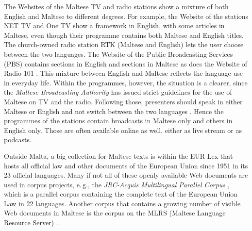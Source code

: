 \begin{multicols}{2}
The Websites of the Maltese TV and radio stations show a mixture of both English and Maltese to different degrees. For example, the Website of the stations NET TV \cite{NetTV1} and One TV \cite{OneTV1} show a framework in English, with some articles in Maltese, even though their programme contains both Maltese and English titles. The church-owned radio station RTK \cite{RTK1} (Maltese and English) lets the user choose between the two languages. The Website of the Public Broadcasting Services (PBS) \cite{PBS1} contains sections in English and sections in Maltese as does the Website of Radio 101 \cite{radio101}. This mixture between English and Maltese reflects the language use in everyday life. Within the programmes, however, the situation is a clearer, since the \emph{Maltese Broadcasting Authority} has issued strict guidelines for the use of Maltese on TV and the radio. Following those, presenters should speak in either Maltese or English and not switch between the two languages \cite{Fabri:2011a}. Hence the programmes of the stations contain broadcasts in Maltese only and others in English only. Those are often available online as well, either as live stream or as podcasts.

Outside Malta, a big collection for Maltese texts is within the EUR-Lex \cite{EURLex1} that hosts all official law and other documents of the European Union since 1951 in its 23 official languages.
Many if not all of these openly available Web documents are used in corpus projects, e.\,g., the \emph{JRC-Acquis Multilingual Parallel Corpus} \cite{JRC-Acquis1}, which is a parallel corpus containing the complete text of the European Union Law in 22 languages. Another corpus that contains a growing number of visible Web documents in Maltese is the corpus on the MLRS (Maltese Language Resource Server) \cite{MLRS1}.
\end{multicols}

\clearpage


